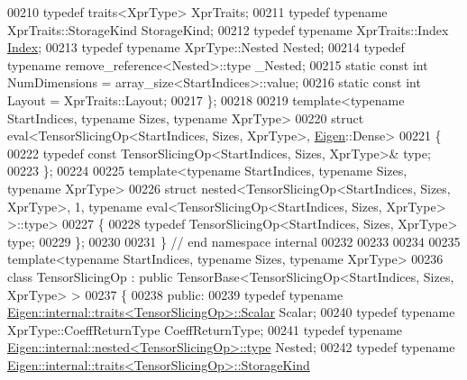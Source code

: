 \begin{DoxyCode}
00210   \textcolor{keyword}{typedef} traits<XprType> XprTraits;
00211   \textcolor{keyword}{typedef} \textcolor{keyword}{typename} XprTraits::StorageKind StorageKind;
00212   \textcolor{keyword}{typedef} \textcolor{keyword}{typename} XprTraits::Index \hyperlink{namespace_eigen_a62e77e0933482dafde8fe197d9a2cfde}{Index};
00213   \textcolor{keyword}{typedef} \textcolor{keyword}{typename} XprType::Nested Nested;
00214   \textcolor{keyword}{typedef} \textcolor{keyword}{typename} remove\_reference<Nested>::type \_Nested;
00215   \textcolor{keyword}{static} \textcolor{keyword}{const} \textcolor{keywordtype}{int} NumDimensions = array\_size<StartIndices>::value;
00216   \textcolor{keyword}{static} \textcolor{keyword}{const} \textcolor{keywordtype}{int} Layout = XprTraits::Layout;
00217 \};
00218 
00219 \textcolor{keyword}{template}<\textcolor{keyword}{typename} StartIndices, \textcolor{keyword}{typename} Sizes, \textcolor{keyword}{typename} XprType>
00220 \textcolor{keyword}{struct }eval<TensorSlicingOp<StartIndices, Sizes, XprType>, \hyperlink{namespace_eigen}{Eigen}::Dense>
00221 \{
00222   \textcolor{keyword}{typedef} \textcolor{keyword}{const} TensorSlicingOp<StartIndices, Sizes, XprType>& type;
00223 \};
00224 
00225 \textcolor{keyword}{template}<\textcolor{keyword}{typename} StartIndices, \textcolor{keyword}{typename} Sizes, \textcolor{keyword}{typename} XprType>
00226 \textcolor{keyword}{struct }nested<TensorSlicingOp<StartIndices, Sizes, XprType>, 1, typename eval<TensorSlicingOp<StartIndices,
       Sizes, XprType> >::type>
00227 \{
00228   \textcolor{keyword}{typedef} TensorSlicingOp<StartIndices, Sizes, XprType> type;
00229 \};
00230 
00231 \}  \textcolor{comment}{// end namespace internal}
00232 
00233 
00234 
00235 \textcolor{keyword}{template}<\textcolor{keyword}{typename} StartIndices, \textcolor{keyword}{typename} Sizes, \textcolor{keyword}{typename} XprType>
00236 \textcolor{keyword}{class }TensorSlicingOp : \textcolor{keyword}{public} TensorBase<TensorSlicingOp<StartIndices, Sizes, XprType> >
00237 \{
00238   \textcolor{keyword}{public}:
00239   \textcolor{keyword}{typedef} \textcolor{keyword}{typename} \hyperlink{struct_eigen_1_1internal_1_1traits}{Eigen::internal::traits<TensorSlicingOp>::Scalar}
       Scalar;
00240   \textcolor{keyword}{typedef} \textcolor{keyword}{typename} XprType::CoeffReturnType CoeffReturnType;
00241   \textcolor{keyword}{typedef} \textcolor{keyword}{typename} \hyperlink{class_eigen_1_1internal_1_1_tensor_lazy_evaluator_writable}{Eigen::internal::nested<TensorSlicingOp>::type}
       Nested;
00242   \textcolor{keyword}{typedef} \textcolor{keyword}{typename} \hyperlink{struct_eigen_1_1internal_1_1traits}{Eigen::internal::traits<TensorSlicingOp>::StorageKind}

\end{DoxyCode}

